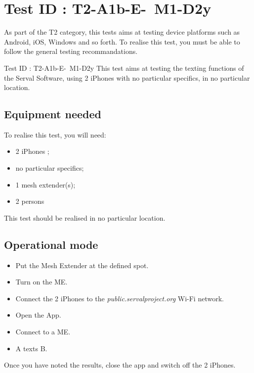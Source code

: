 \documentclass[oneside]{book}
\begin{document}
\section{Test ID : T2-A1b-E- M1-D2y}
\begin{itshape}
As part of the T2 category, this tests aims at testing device platforms such as Android, iOS, Windows and so forth.
To realise this test, you must be able to follow the general testing recommandations.
\end{itshape}
\newline
Test ID : T2-A1b-E- M1-D2y
 This test aims at testing the texting functions of the Serval Software, using 2 iPhones with no particular specifics, in no particular location.
\subsection{Equipment needed} To realise this test, you will need:
\begin{itemize}
\item 2 iPhones ;
\item no particular specifics;
\item 1 mesh extender(s);
\item 2 persons
\end{itemize}
This test should be realised in no particular location.
\subsection{Operational mode} \begin{itemize}
\item Put the Mesh Extender at the defined spot.
\item Turn on the ME.
\item Connect the 2 iPhones to the \emph{public.servalproject.org} Wi-Fi network.
\item Open the App.
\item Connect to a ME.
\item A texts B.
\end{itemize}
Once you have noted the results, close the app and switch off the 2 iPhones.
\end{document}
